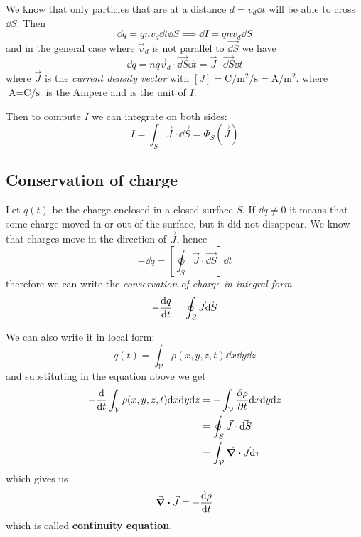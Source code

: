 \documentclass[12pt]{extarticle}
\begin{document}
We know that only particles that are at a distance $d = v_d \dd t$ will be able to cross $\dd{S}$.
Then
\begin{equation}
	\dd q = q n v_d \dd t \dd S \implies \dd I = q n v_d \dd S
\end{equation}
and in the general case where $\vec v_d$ is not parallel to $\vec{\dd S}$ we have
\begin{equation}
	\dd q = n q \vec v_d \cdot \vec{\dd S} \dd t = \vec J \cdot \vec{\dd S} \dd t
\end{equation}
where $\vec J$ is the \emph{current density vector}
with $[J] = \si{\coulomb \per \meter \squared \per \second} = \si{\ampere \per \meter \squared}$.
where $\si{\ampere} = \si{\coulomb \per \second}$ is the Ampere and is the unit of $I$.

Then to compute $I$ we can integrate on both sides:
\begin{equation}
	I = \int_S \vec J \cdot \vec{\dd{S}} = \Phi_S (\vec J)
\end{equation}

\subsection{Conservation of charge}

Let $q(t)$ be the charge enclosed in a closed surface $S$.
If $\dd q \neq 0$ it means that some charge moved in or out of the surface, but it did not disappear.
We know that charges move in the direction of $\vec J$, hence
\begin{equation}
	-\dd q = \left[\oint_S \vec J \cdot \vec{\dd S}\right] \dd t
\end{equation}
therefore we can write the \emph{conservation of charge in integral form}
\begin{equation}
	- \dv{q}{t} = \oint_S \vec J \vec{\dd S}
\end{equation}

We can also write it in local form:
\begin{equation}
	q(t) = \int_\mathcal{V} \rho(x, y, z, t) \dd x \dd y \dd z
\end{equation}
and substituting in the equation above we get
\begin{align}
	- \dv{t} \int_\mathcal{V} \rho(x, y, z, t) \dd x \dd y \dd z & = - \int_\mathcal{V} \pdv{\rho}{t} \dd x \dd y \dd z \\
	                                                             & = \oint_S \vec J \cdot \vec{\dd S}                   \\
	                                                             & = \int_\mathcal{V} \div \vec J \dd \tau
\end{align}
which gives us
\begin{equation}
	\div \vec J = - \dv{\rho}{t}
\end{equation}
which is called \textbf{continuity equation}.
\end{document}

